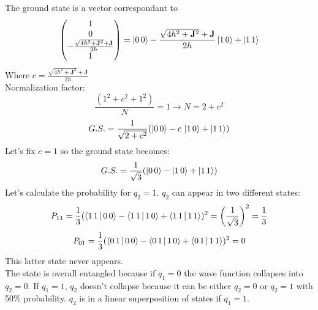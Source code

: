 The ground state is a vector correspondant to
\[
\begin{pmatrix}1\\0\\-\frac{\sqrt{4h^2+\mathbf{J}^2}+\mathbf{J}}{2h}\\1 \end{pmatrix}=\ket{0\,0}-\frac{\sqrt{4h^2+\mathbf{J}^2}+\mathbf{J}}{2h}\ket{1\,0}+\ket{1\,1}
\]
Where $c=\frac{\sqrt{4h^2+\mathbf{J}^2}+\mathbf{J}}{2h}$\\
Normalization factor:
\[
\frac{(1^2+c^2+1^2)}{N}=1 \rightarrow N=2+c^2
\]
\[
G.S.=\frac{1}{\sqrt{2+c^2}}(\ket{0\,0}-c\,\ket{1\,0}+\ket{1\,1})
\]
Let's fix $c=1$ so the ground state becomes:
\[
G.S.= \frac{1}{\sqrt{3}}(\ket{0\,0}-\ket{1\,0}+\ket{1\,1})
\]
Let's calculate the probability for $q_2=1$. $q_2$ can appear in two different states:
\[P_{1 1}=\frac{1}{3}(\braket{1\,1\,|\,0\,0}-\braket{1\,1\,|\,1\,0}+\braket{1\,1\,|\,1\,1})^2=\bigg(\frac{1}{\sqrt{3}}\bigg)^2=\frac{1}{3}\]
\[P_{0 1}=\frac{1}{3}(\braket{0\,1\,|\,0\,0}-\braket{0\,1\,|\,1\,0}+\braket{0\,1\,|\,1\,1})^2=0\]
This latter state never appears.\\
The state is overall entangled because if $q_1=0$ the wave function collapses into $q_2=0$. If $q_1=1$, $q_2$ doesn't collapse because it can be either $q_2=0$ or $q_2=1$ with 50\% probability. $q_2$ is in a linear superposition of states if $q_1=1$.\\

